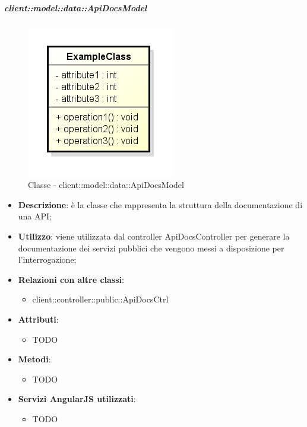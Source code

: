 		\subparagraph{client::model::data::ApiDocsModel} %
		\label{subp:client_model_data_apidocsmodel}
			\begin{figure}[htbp]
				\centering
				\centerline{\includegraphics[scale=0.7]{./images/client/classes/example_class.png}}
				\caption{Classe - client::model::data::ApiDocsModel}
			\end{figure}
			\begin{itemize}
				\item \textbf{Descrizione}: è la classe che rappresenta la struttura della documentazione di una API;
				\item \textbf{Utilizzo}: viene utilizzata dal controller ApiDocsController per generare la documentazione dei servizi pubblici che vengono messi a disposizione per l'interrogazione;
				\item \textbf{Relazioni con altre classi}:
					\begin{itemize}
						\item client::controller::public::ApiDocsCtrl
					\end{itemize}
				\item \textbf{Attributi}:
					\begin{itemize}
						\item TODO
					\end{itemize}

				\item \textbf{Metodi}:
					\begin{itemize}
						\item TODO
					\end{itemize}

				\item \textbf{Servizi AngularJS utilizzati}:
					\begin{itemize}
						\item TODO
					\end{itemize}
			\end{itemize}


